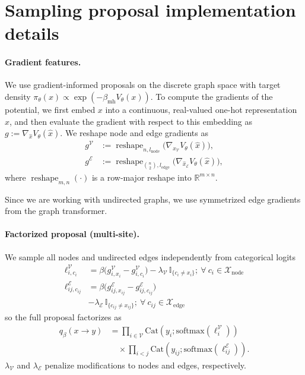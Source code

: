 \section{Sampling proposal implementation details}
\label{app:sampling-details}

\paragraph{Gradient features.}
We use gradient-informed proposals on the discrete graph space with target density
\(\pi_\theta(x)\propto \exp\left(-\beta_{\mathrm{mh}}V_\theta(x)\right)\). To compute the gradients of the potential, we first embed \( x \) into a continuous, real-valued one-hot representation \( \hat{x} \), and then evaluate the gradient with respect to this embedding as \( g := \nabla_{\hat{x}} V_{\theta}(\hat{x}) \).
We reshape node and edge gradients as
\begin{align}
g^\mathcal{V} & := \operatorname{reshape}_{n,l_{\mathrm{node}}}\big(\nabla_{\hat{x}_\mathcal{V}} V_\theta(\hat{x})\big),\\
g^\mathcal{E} & := \operatorname{reshape}_{\binom{n}{2},l_{\mathrm{edge}}}\big(\nabla_{\hat{x}_\mathcal{E}} V_\theta(\hat{x})\big),
\end{align}
where $\operatorname{reshape}_{m,n}(\cdot)$ is a row-major reshape into $\mathbb{R}^{m\times n}$.

Since we are working with undirected graphs, we use symmetrized edge gradients from the graph transformer.

\paragraph{Factorized proposal (multi-site).}
We sample all nodes and undirected edges independently from categorical logits
\begin{align}
\ell^\mathcal{V}_{i,c_i} & = \beta\big(g^\mathcal{V}_{i,x_i}-g^\mathcal{V}_{i,c_i}\big)-\lambda_\mathcal{V}\,\mathbb{I}_{\{c_i \neq x_i\}};~\forall~c_i \in \mathcal{X}_\mathrm{node} \\
\ell^\mathcal{E}_{{ij},c_{ij}} &= \beta\big(g^\mathcal{E}_{ij,x_{ij}}-g^\mathcal{E}_{ij,c_{ij}}\big) \nonumber\\
&-\lambda_\mathcal{E}\,\mathbb{I}_{\{c_{ij}\ne x_{ij}\}};~\forall~c_{ij} \in \mathcal{X}_\mathrm{edge}
\end{align}
so the full proposal factorizes as
\begin{equation}
\begin{aligned}
q_{\beta}(x\to y)
&=
\prod_{i\in\mathcal{V}}\mathrm{Cat}\left(y_i;\mathrm{softmax}(\ell_i^\mathcal{V})\right)\\
&\quad\times\prod_{i<j}\mathrm{Cat}\left(y_{ij};\mathrm{softmax}(\ell_{ij}^\mathcal{E})\right).
\end{aligned}
\end{equation}
$\lambda_{\mathcal{V}}$ and $\lambda_{\mathcal{E}}$ penalize modifications to nodes and edges, respectively.


